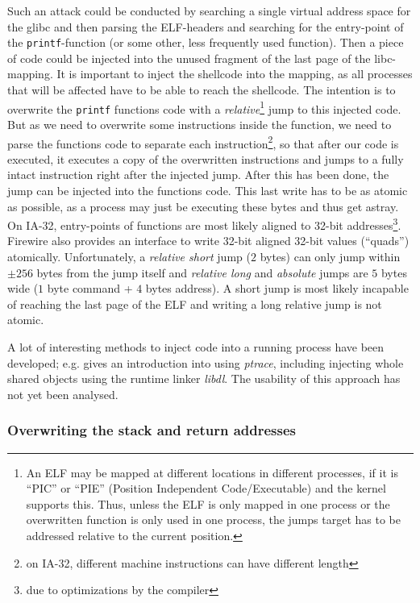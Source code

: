 Such an attack could be conducted by searching a single virtual address space
for the glibc and then parsing the ELF-headers and searching for the entry-point
of the \texttt{printf}-function (or some other, less frequently used function).
Then a piece of code could be injected into the unused fragment of the last page
of the libc-mapping. It is important to inject the shellcode into the mapping,
as all processes that will be affected have to be able to reach the shellcode.
The intention is to overwrite the \texttt{printf} functions code with a
\emph{relative}\footnote{An ELF may be mapped at different locations in
different processes, if it is ``PIC'' or ``PIE'' (Position Independent
Code/Executable) and the kernel supports this.  Thus, unless the ELF is only
mapped in one process or the overwritten function is only used in one process,
the jumps target has to be addressed relative to the current position.} jump to
this injected code.  But as we need to overwrite some instructions inside the
function, we need to parse the functions code to separate each
instruction\footnote{on IA-32, different machine instructions can have different
length}, so that after our code is executed, it executes a copy of the
overwritten instructions and jumps to a fully intact instruction right after the
injected jump. After this has been done, the jump can be injected into the
functions code. This last write has to be as atomic as possible, as a process
may just be executing these bytes and thus get astray.  On IA-32, entry-points
of functions are most likely aligned to 32-bit addresses\footnote{due to
optimizations by the compiler}.  Firewire also provides an interface to write
32-bit aligned 32-bit values (``quads'') atomically.  Unfortunately, a
\emph{relative short} jump ($2$ bytes) can only jump within $\pm256$ bytes from
the jump itself and \emph{relative long} and \emph{absolute} jumps are $5$ bytes
wide ($1$ byte command + $4$ bytes address).  A short jump is most likely
incapable of reaching the last page of the ELF and writing a long relative jump
is not atomic.

A lot of interesting methods to inject code into a running process have been
developed; e.g.  \cite{phrack59.8:2002} gives an introduction into using
\emph{ptrace}, including injecting whole shared objects using the runtime linker
\emph{libdl}.  The usability of this approach has not yet been analysed.


\subsubsection{Overwriting the stack and return addresses}

